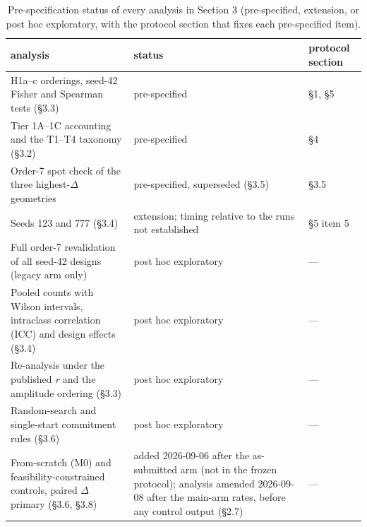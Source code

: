 \documentclass[11pt,a4paper]{article}
\begin{document}
\begin{table}[htbp]
\centering
\setlength{\tabcolsep}{3pt}\footnotesize
\caption{Pre-specification status of every analysis in Section 3 (pre-specified, extension, or post hoc exploratory, with the protocol section that fixes each pre-specified item).}
\label{tab:5}
\begin{tabular}{@{}
  >{\RaggedRight\arraybackslash}p{}
  >{\RaggedRight\arraybackslash}p{}
  >{\RaggedRight\arraybackslash}p{}@{}}
\toprule\noalign{}
\begin{minipage}[b]{\linewidth}\raggedright
analysis
\end{minipage} & \begin{minipage}[b]{\linewidth}\raggedright
status
\end{minipage} & \begin{minipage}[b]{\linewidth}\raggedright
protocol section
\end{minipage} \\
\midrule\noalign{}
H1a--c orderings, seed-42 Fisher and Spearman tests (\S{}3.3) & pre-specified & \S{}1, \S{}5 \\
Tier 1A--1C accounting and the T1--T4 taxonomy (\S{}3.2) & pre-specified & \S{}4 \\
Order-7 spot check of the three highest-\ensuremath{\Delta} geometries & pre-specified, superseded (\S{}3.5) & \S{}3.5 \\
Seeds 123 and 777 (\S{}3.4) & extension; timing relative to the runs not established & \S{}5 item 5 \\
Full order-7 revalidation of all seed-42 designs (legacy arm only) & post hoc exploratory & --- \\
Pooled counts with Wilson intervals, intraclass correlation (ICC) and design effects (\S{}3.4) & post hoc exploratory & --- \\
Re-analysis under the published \emph{r} and the amplitude ordering (\S{}3.3) & post hoc exploratory & --- \\
Random-search and single-start commitment rules (\S{}3.6) & post hoc exploratory & --- \\
From-scratch (M0) and feasibility-constrained controls, paired \ensuremath{\Delta} primary (\S{}3.6, \S{}3.8) & added 2026-09-06 after the as-submitted arm (not in the frozen protocol); analysis amended 2026-09-08 after the main-arm rates, before any control output (\S{}2.7) & --- \\

\end{tabular}
\end{table}
\end{document}
